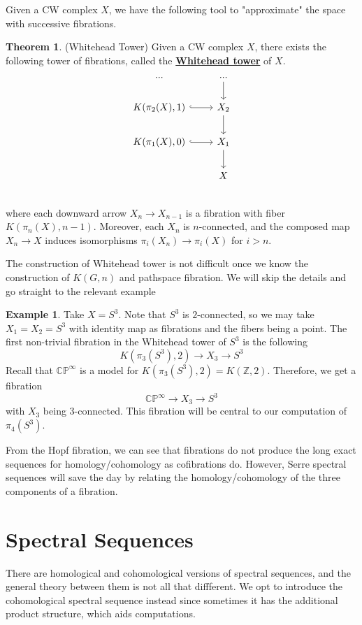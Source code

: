 \documentclass{article}
\theoremstyle{definition}
\newtheorem{theorem}{Theorem}[section]
\theoremstyle{definition}
\theoremstyle{definition}
\theoremstyle{definition}
\theoremstyle{definition}
\theoremstyle{definition}
\newtheorem{example}{Example}[theorem]
\begin{document}
Given a CW complex $X$, we have the following tool to "approximate" the space with successive fibrations. 
\begin{tcolorbox}[colback=red!5!white,colframe=red!30!white]
\begin{theorem}
(Whitehead Tower) Given a CW complex $X$, there exists the following tower of fibrations, called the \underline{\textbf{Whitehead tower}} of $X$.
\[ \begin{tikzcd}
...& ...\arrow[d]\\
K(\pi_2(X),1)\arrow[r,hookrightarrow]& X_2\arrow[d]\\
K(\pi_1(X),0)\arrow[r,hookrightarrow]& X_1\arrow[d]\\
& X\\
\end{tikzcd} \]
where each downward arrow $X_n\to X_{n-1}$ is a fibration with fiber $K(\pi_n(X),n-1)$. Moreover, each $X_n$ is $n$-connected, and the composed map $X_n\to X$ induces isomorphisms $\pi_i(X_n)\to \pi_i(X)$ for $i>n$.
\end{theorem}
\end{tcolorbox}
The construction of Whitehead tower is not difficult once we know the  construction of $K(G,n)$ and pathspace fibration. We will skip the details and go straight to the relevant example


 \begin{tcolorbox}[colback=yellow!5!white,colframe=yellow!30!white]
 \begin{example}
 Take $X=S^3$. Note that $S^3$ is $2$-connected, so we may take $X_1=X_2=S^3$ with identity map as fibrations and the fibers being a point. The first non-trivial fibration in the Whitehead tower of $S^3$ is the following 
 \[K(\pi_3(S^3),2)\to X_3\to S^3\]
 Recall that $\mathbb{CP}^{\infty}$ is a model for $K(\pi_3(S^3),2)=K(\mathbb{Z},2)$. Therefore, we get a fibration 
 \[\mathbb{CP} ^{\infty}\to X_3\to S^3\] 
 with $X_3$ being $3$-connected. This fibration will be central to our computation of $\pi_4(S^3)$. 
 \end{example}
 \end{tcolorbox}

From the Hopf fibration, we can see that fibrations do not produce the long exact sequences for homology/cohomology as cofibrations do. However, Serre spectral sequences will save the day by relating the homology/cohomology of the three components of a fibration. 
\section{Spectral Sequences}
There are homological and cohomological versions of spectral sequences, and the general theory between them is not all that diffferent. We opt to introduce the cohomological spectral sequence instead since sometimes it has the additional product structure, which aids computations.
\end{document}
